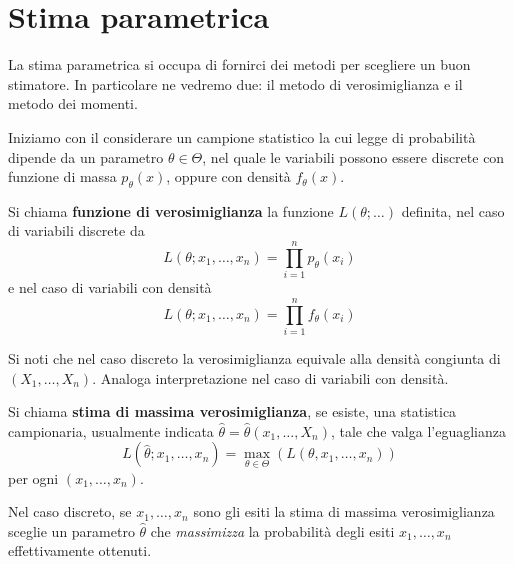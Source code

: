 \section{Stima parametrica}
La stima parametrica si occupa di fornirci dei metodi per scegliere un buon stimatore. In
particolare ne vedremo due: il metodo di verosimiglianza e il metodo dei momenti.

Iniziamo con il considerare un campione statistico la cui legge di probabilità dipende da un
parametro $\theta \in \Theta$, nel quale le variabili possono essere discrete con funzione di
massa $p_\theta(x)$, oppure con densità $f_\theta(x)$.

\begin{definition}
	Si chiama \textbf{funzione di verosimiglianza} la funzione $L(\theta; \dots)$ definita, nel
	caso di variabili discrete da
	\[ L(\theta; x_1, \ldots, x_n) = \prod_{i=1}^n p_\theta(x_i) \]
	e nel caso di variabili con densità
	\[ L(\theta; x_1, \ldots, x_n) = \prod_{i=1}^n f_\theta(x_i) \]
\end{definition}

Si noti che nel caso discreto la verosimiglianza equivale alla densità congiunta di
$(X_1, \dots, X_n)$. Analoga interpretazione nel caso di variabili con densità.

\begin{definition}
	Si chiama \textbf{stima di massima verosimiglianza}, se esiste, una statistica campionaria,
	usualmente indicata $\hat{\theta} = \hat{\theta} (x_1, \dots, X_n)$, tale che valga
	l'eguaglianza
	\[ L(\hat{\theta}; x_1, \dots, x_n) = \max_{\theta \in \Theta} (L(\theta, x_1, \dots, x_n)) \]
	per ogni $(x_1, \dots, x_n)$.
\end{definition}

Nel caso discreto, se $x_1, \dots, x_n$ sono gli esiti la stima di massima verosimiglianza sceglie
un parametro $\hat{\theta}$ che \emph{massimizza} la probabilità degli esiti $x_1, \dots, x_n$
effettivamente ottenuti.